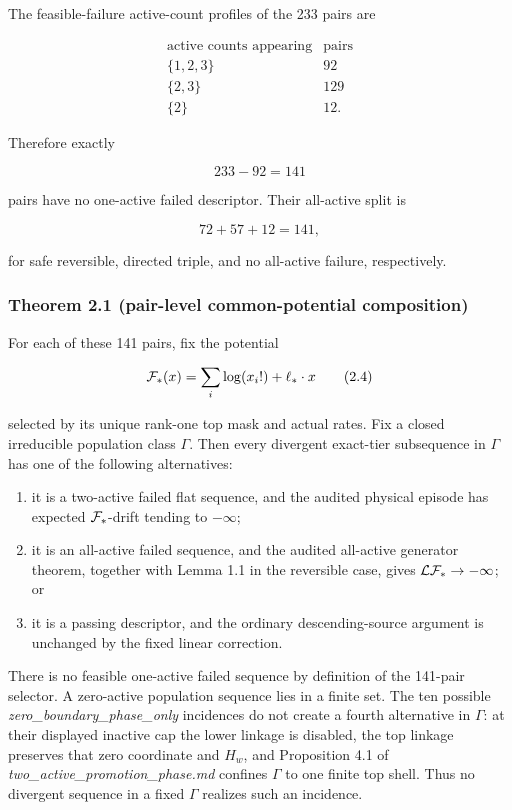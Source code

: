 The feasible-failure active-count profiles of the 233 pairs are

\[
\begin{array}{c|r}
\text{active counts appearing}&\text{pairs}\\ \hline
\{1,2,3\}&92\\
\{2,3\}&129\\
\{2\}&12 .
\end{array}
\tag{2.1}
\]

Therefore exactly

\[
 233-92=141
\tag{2.2}
\]

pairs have no one-active failed descriptor. Their all-active split is

\[
 72+57+12=141,
\tag{2.3}
\]

for safe reversible, directed triple, and no all-active failure,
respectively.

\subsubsection{Theorem 2.1 (pair-level common-potential
composition)}

For each of these 141 pairs, fix the potential

\[
 {\cal F}_*(x)=\sum_i\log(x_i!)+\ell_*\mathbin{\cdot}x
\tag{2.4}
\]

selected by its unique rank-one top mask and actual rates. Fix a closed
irreducible population class \(\Gamma\). Then every divergent exact-tier
subsequence in \(\Gamma\) has one of the following alternatives:

\begin{enumerate}
\def\labelenumi{\arabic{enumi}.}
\tightlist
\item
  it is a two-active failed flat sequence, and the audited physical
  episode has expected \({\cal F}_*\)-drift tending to \(-\infty\);
\item
  it is an all-active failed sequence, and the audited all-active
  generator theorem, together with Lemma 1.1 in the reversible case,
  gives \({\cal L}{\cal F}_*\to-\infty\); or
\item
  it is a passing descriptor, and the ordinary descending-source
  argument is unchanged by the fixed linear correction.
\end{enumerate}

There is no feasible one-active failed sequence by definition of the
141-pair selector. A zero-active population sequence lies in a finite
set. The ten possible \emph{zero\_boundary\_phase\_only} incidences do
not create a fourth alternative in \(\Gamma\): at their displayed
inactive cap the lower linkage is disabled, the top linkage preserves
that zero coordinate and \(H_w\), and Proposition 4.1 of
\emph{two\_active\_promotion\_phase.md} confines \(\Gamma\) to one
finite top shell. Thus no divergent sequence in a fixed \(\Gamma\)
realizes such an incidence.

